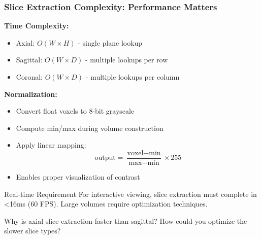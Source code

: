 \begin{frame}
\frametitle{Slice Extraction Complexity: Performance Matters}

\textbf{Time Complexity:}
\begin{itemize}
  \item Axial: $O(W \times H)$ - single plane lookup
  \item Sagittal: $O(W \times D)$ - multiple lookups per row
  \item Coronal: $O(W \times D)$ - multiple lookups per column
\end{itemize}

\vspace{0.5cm}

\textbf{Normalization:}
\begin{itemize}
  \item Convert float voxels to 8-bit grayscale
  \item Compute min/max during volume construction
  \item Apply linear mapping:
  $$\text{output} = \frac{\text{voxel} - \text{min}}{\text{max} - \text{min}} \times 255$$
  \item Enables proper visualization of contrast
\end{itemize}

\begin{alertblock}{Real-time Requirement}
For interactive viewing, slice extraction must complete in <16ms (60 FPS). Large volumes require optimization techniques.
\end{alertblock}

Why is axial slice extraction faster than sagittal? How could you optimize the slower slice types?
\end{frame}